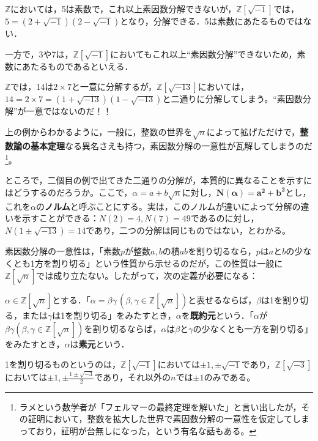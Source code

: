 \begin{mybox}[{$\mathbb{Z}[\sqrt{-1}]$}]
    $\mathbb{Z}$においては，5は素数で，これ以上素因数分解できないが，$\mathbb{Z}[\sqrt{-1}]$では，$5=\left(2+\sqrt{-1}\right)\left(2-\sqrt{-1}\right)$となり，分解できる．5は素数にあたるものではない．

    一方で，3や7は，$\mathbb{Z}[\sqrt{-1}]$においてもこれ以上``素因数分解''できないため，素数にあたるものであるといえる．
\end{mybox}

\begin{mybox}[{$\mathbb{Z}[\sqrt{-13}]$}]
    $\mathbb{Z}$では，14は$2\times 7$と一意に分解するが，$\mathbb{Z}[\sqrt{-13}]$においては，$14=2\times 7=(1+\sqrt{-13})(1-\sqrt{-13})$と二通りに分解してしまう。``素因数分解''が一意ではないのだ！！
\end{mybox}

上の例からわかるように，一般に，整数の世界を$\sqrt{n}$によって拡げただけで，\textbf{整数論の基本定理}なる異名さえも持つ，素因数分解の一意性が瓦解してしまうのだ\footnote{ラメという数学者が「フェルマーの最終定理を解いた」と言い出したが，その証明において，整数を拡大した世界で素因数分解の一意性を仮定してしまっており，証明が台無しになった，という有名な話もある。}。

ところで，二個目の例で出てきた二通りの分解が，本質的に異なることを示すにはどうするのだろうか。ここで，$\alpha=a+b\sqrt{n}$に対し，$\boldsymbol{N(\alpha)=a^2+b^2}$とし，これを$\alpha$の\textbf{ノルム}と呼ぶことにする。実は，このノルムが違いによって分解の違いを示すことができる：$N(2)=4, N(7)=49$であるのに対し，$N(1\pm\sqrt{-13})=14$であり，二つの分解は同じものではない，とわかる。

素因数分解の一意性は，「素数$p$が整数$a, b$の積$ab$を割り切るなら，$p$は$a$と$b$の少なくとも1方を割り切る」という性質から示せるのだが，この性質は一般に$\mathbb{Z}[\sqrt{n}]$では成り立たない。したがって，次の定義が必要になる：

\begin{dfn}
    $\alpha\in\mathbb{Z}[\sqrt{n}]$とする．「$\alpha=\beta\gamma\,\left(\beta, \gamma\in\mathbb{Z}[\sqrt{n}]\right)$と表せるならば，$\beta$は1を割り切る，または$\gamma$は1を割り切る」をみたすとき，$\alpha$を\textbf{既約元}という．「$\alpha$が$\beta\gamma\left(\beta, \gamma\in\mathbb{Z}[\sqrt{n}]\right)$を割り切るならば，$\alpha$は$\beta$と$\gamma$の少なくとも一方を割り切る」をみたすとき，$\alpha$は\textbf{素元}という．
\end{dfn}

1を割り切るものというのは，$\mathbb{Z}[\sqrt{-1}]$においては$\pm 1, \pm\sqrt{-1}$であり，$\mathbb{Z}[\sqrt{-3}]$においては$\pm 1, \pm\frac{1\pm\sqrt{-3}}{2}$であり，それ以外の$n$では$\pm 1$のみである。

